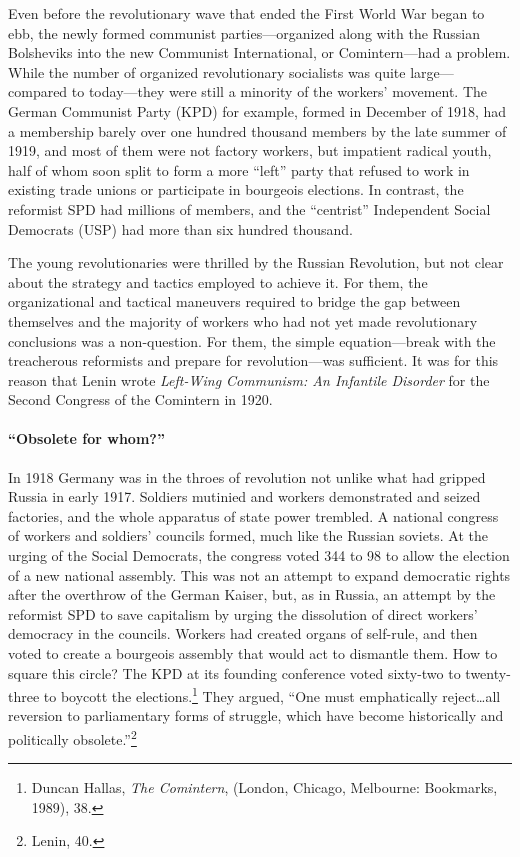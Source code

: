 Even before the revolutionary wave that ended the First World War began to ebb, the newly formed communist parties---organized along with the Russian Bolsheviks into the new Communist International, or Comintern---had a problem. While the number of organized revolutionary socialists was quite large---compared to today---they were still a minority of the workers' movement. The German Communist Party (KPD) for example, formed in December of 1918, had a membership barely over one hundred thousand members by the late summer of 1919, and most of them were not factory workers, but impatient radical youth, half of whom soon split to form a more ``left'' party that refused to work in existing trade unions or participate in bourgeois elections. In contrast, the reformist SPD had millions of members, and the ``centrist'' Independent Social Democrats (USP) had more than six hundred thousand.

The young revolutionaries were thrilled by the Russian Revolution, but not clear about the strategy and tactics employed to achieve it. For them, the organizational and tactical maneuvers required to bridge the gap between themselves and the majority of workers who had not yet made revolutionary conclusions was a non-question. For them, the simple equation---break with the treacherous reformists and prepare for revolution---was sufficient. It was for this reason that Lenin wrote \emph{Left-Wing Communism: An Infantile Disorder} for the Second Congress of the Comintern in 1920.

\sectiondivider

\paragraph{``Obsolete for whom?''}

In 1918 Germany was in the throes of revolution not unlike what had gripped Russia in early 1917. Soldiers mutinied and workers demonstrated and seized factories, and the whole apparatus of state power trembled. A national congress of workers and soldiers' councils formed, much like the Russian soviets. At the urging of the Social Democrats, the congress voted 344 to 98 to allow the election of a new national assembly. This was not an attempt to expand democratic rights after the overthrow of the German Kaiser, but, as in Russia, an attempt by the reformist SPD to save capitalism by urging the dissolution of direct workers' democracy in the councils. Workers had created organs of self-rule, and then voted to create a bourgeois assembly that would act to dismantle them. How to square this circle? The KPD at its founding conference voted sixty-two to twenty-three to boycott the elections.\footnote{Duncan Hallas, \emph{The Comintern}, (London, Chicago, Melbourne: Bookmarks, 1989), 38.} They argued, ``One must emphatically reject\ldots all reversion to parliamentary forms of struggle, which have become historically and politically obsolete.''\footnote{Lenin, 40.}


